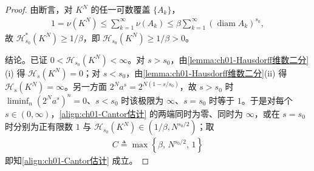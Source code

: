\documentclass[../../main.tex]{subfiles}%
\begin{document}
\begin{proof}
由断言，对 $K^N$ 的任一可数覆盖 $\{A_k\}$，
\begin{align*}
1=\nu(K^N)\leqslant\sum_{k=1}^\infty\nu(A_k)\leqslant\beta\sum_{k=1}^\infty\left(\operatorname{diam}A_k\right)^{s_0},
\end{align*}
故 $\mathcal{H}_{s_0}^*(K^N)\geqslant1/\beta$，即 $\mathcal{H}_{s_0}(K^N)\geqslant1/\beta>0$。

结论。已证 $0<\mathcal{H}_{s_0}(K^N)<\infty$。对 $s>s_0$，由\cref{lemma:ch01-Hausdorff维数二分}(i) 得 $\mathcal{H}_s(K^N)=0$；对 $s<s_0$，由\cref{lemma:ch01-Hausdorff维数二分}(ii) 得 $\mathcal{H}_s(K^N)=\infty$。另一方面 $2^Na^s=2^{N(1-s/s_0)}$，故 $s>s_0$ 时 $\liminf_n\left(2^Na^s\right)^n=0$、$s<s_0$ 时该极限为 $\infty$、$s=s_0$ 时等于 $1$。于是对每个 $s\in(0,\infty)$，\eqref{align:ch01-Cantor估计} 的两端同时为零、同时为 $\infty$，或在 $s=s_0$ 时分别为正有限数 $1$ 与 $\mathcal{H}_{s_0}(K^N)\in(1/\beta,N^{s_0/2})$；取
\begin{align*}
C\triangleq\max\left\{\beta,\,N^{s_0/2},\,1\right\}
\end{align*}
即知\eqref{align:ch01-Cantor估计} 成立。
\end{proof}
\end{document}
